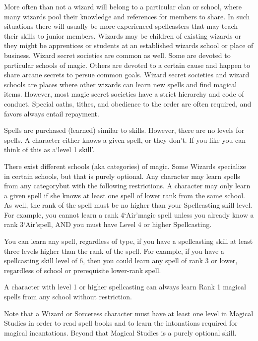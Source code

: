 \documentclass[twoside]{book}
\begin{document}
    {  
    More often than not a wizard will belong to a particular clan or school, where many wizards pool their knowledge and references for members to share. In such situations there will usually be more experienced spellcasters that may teach their skills to junior members. Wizards may be children of existing wizards or they might be apprentices or students at an established wizards school or place of business. Wizard secret societies are common as well. Some are devoted to particular schools of magic. Others are devoted to a certain cause and happen to share arcane secrets to persue common goals. Wizard secret societies and wizard schools are places where other wizards can learn new spells and find magical items. However, most magic secret societies have a strict hierarchy and code of conduct. Special oaths, tithes, and obedience to the order are often required, and favors always entail repayment.
    }
  
    {  
    Spells are purchased (learned) similar to skills. However, there are no levels for spells. A character either knows a given spell, or they don't. If you like you can think of this as a`level 1 skill'.
    }
  
    {  
    There exist different schools (aka categories) of magic. Some Wizards specialize in certain schools, but that is purely optional. Any character may learn spells from any categorybut with the following restrictions. A character may only learn a given spell if she knows at least one spell of lower rank from the same school. As well, the rank of the spell must be no higher than your Spellcasting skill level. For example, you cannot learn a rank 4`Air'magic spell unless you already know a rank 3`Air'spell, AND you must have Level 4 or higher Spellcasting.
    }
  
    {  
    You can learn any spell, regardless of type, if you have a spellcasting skill at least three levels higher than the rank of the spell. For example, if you have a spellcasting skill level of 6, then you could learn any spell of rank 3 or lower, regardless of school or prerequisite lower-rank spell.
    }
  
    {  
    A character with level 1 or higher spellcasting can always learn Rank 1 magical spells from any school without restriction.
    }
  
    {  
    Note that a Wizard or Sorceress character must have at least one level in Magical Studies in order to read spell books and to learn the intonations required for magical incantations. Beyond that Magical Studies is a purely optional skill.
    }
  
\end{document}
